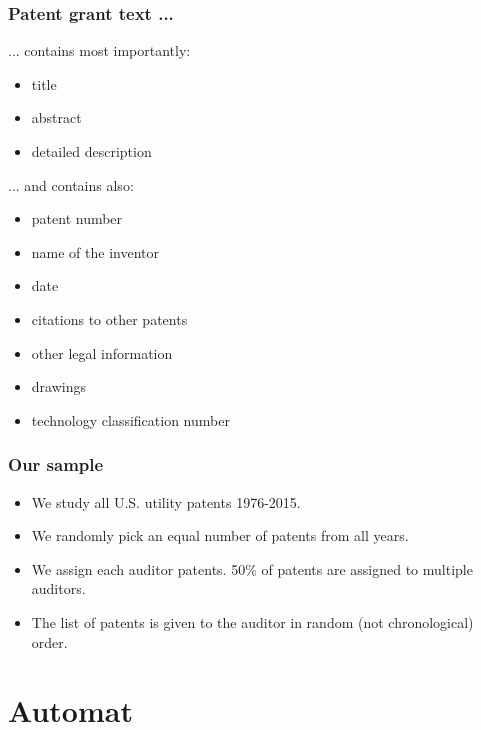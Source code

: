 \documentclass[10pt]{beamer}
\begin{document}
\begin{frame}\frametitle{Patent grant text ...}
... contains most importantly:
	\begin{itemize}	
		\item title
		\item abstract
		\item detailed description
	\end{itemize}
... and contains also:
	\begin{itemize}	
		\item patent number
		\item name of the inventor
		\item date
		\item citations to other patents
		\item other legal information
		\item drawings
		\item technology classification number
	\end{itemize}
\end{frame}


\begin{frame}\frametitle{Our sample}
	\begin{itemize}	
	\item We study all U.S. utility patents 1976-2015.
	\item We randomly pick an equal number of patents from all years.
	\item We assign each auditor patents. 50\% of patents are assigned to multiple auditors.
	\item The list of patents is given to the auditor in random (not chronological) order.
	\end{itemize}
\end{frame}


\section{Automat}
\setcounter{subsection}{1} %
\end{document}
